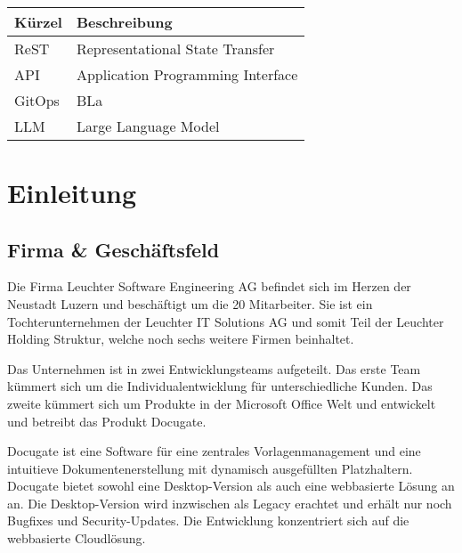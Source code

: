\documentclass{bpraxis}
\begin{document}
\thispagestyle{empty}
~\vspace{5cm}

\\[5mm]
\\[3mm]

\newpage


{\renewcommand{\arraystretch}{1.3}
\begin{tabularx}{\linewidth}{p{4cm}X}
\hline
\rowcolor{lightgray}
\textbf{Kürzel} & \textbf{Beschreibung} \\\hline
ReST & Representational State Transfer \\\hline
API & Application Programming Interface \\\hline
GitOps & BLa \\\hline
LLM & Large Language Model \\\hline
\end{tabularx}
}

\bigbreak

{
  \hypersetup{linkcolor=black}
  \setlength{\parskip}{0pt}
  \tableofcontents
}

\newpage


\section{Einleitung}

\subsection{Firma \& Geschäftsfeld}

Die Firma Leuchter Software Engineering AG befindet sich im Herzen der Neustadt Luzern und beschäftigt um die 20 Mitarbeiter.
Sie ist ein Tochterunternehmen der Leuchter IT Solutions AG und somit Teil der Leuchter Holding Struktur, welche noch sechs weitere Firmen beinhaltet.

Das Unternehmen ist in zwei Entwicklungsteams aufgeteilt. Das erste Team kümmert sich um die Individualentwicklung für unterschiedliche Kunden.
Das zweite kümmert sich um Produkte in der Microsoft Office Welt und entwickelt und betreibt das Produkt Docugate.

Docugate ist eine Software für eine zentrales Vorlagenmanagement und eine intuitieve Dokumentenerstellung mit dynamisch ausgefüllten Platzhaltern.
Docugate bietet sowohl eine Desktop-Version als auch eine webbasierte Lösung an an. Die Desktop-Version wird inzwischen als Legacy erachtet und erhält nur noch Bugfixes und Security-Updates.
Die Entwicklung konzentriert sich auf die webbasierte Cloudlösung.
\end{document}
